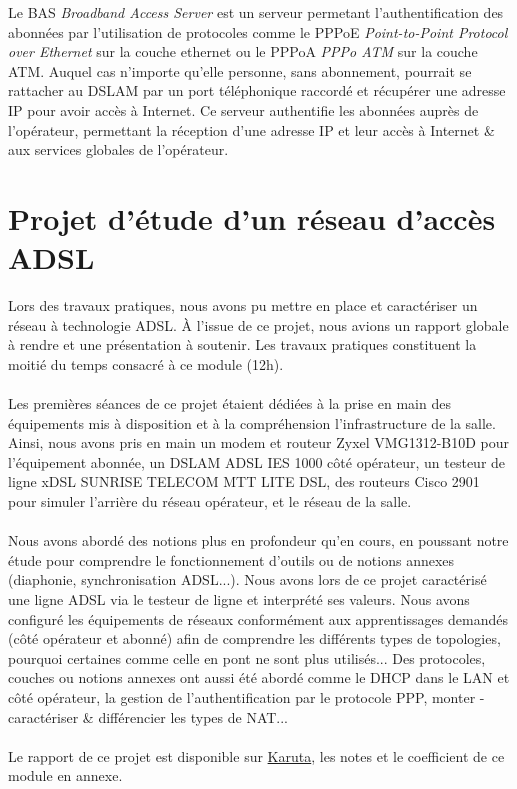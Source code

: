 Le BAS \textit{Broadband Access Server} est un serveur permetant l'authentification des abonnées par l'utilisation de protocoles comme le PPPoE \textit{Point-to-Point Protocol over Ethernet} sur la couche ethernet ou le PPPoA \textit{PPPo ATM} sur la couche ATM. Auquel cas n'importe qu'elle personne, sans abonnement, pourrait se rattacher au DSLAM par un port téléphonique raccordé et récupérer une adresse IP pour avoir accès à Internet. Ce serveur authentifie les abonnées auprès de l'opérateur, permettant la réception d'une adresse IP et leur accès à Internet \& aux services globales de l'opérateur.

\section{Projet d'étude d'un réseau d'accès ADSL}

Lors des travaux pratiques, nous avons pu mettre en place et caractériser un réseau à technologie ADSL. À l'issue de ce projet, nous avions un rapport globale à rendre et une présentation à soutenir. Les travaux pratiques constituent la moitié du temps consacré à ce module (12h).
\\ \\
Les premières séances de ce projet étaient dédiées à la prise en main des équipements mis à disposition et à la compréhension l'infrastructure de la salle. Ainsi, nous avons pris en main un modem et routeur Zyxel VMG1312-B10D pour l'équipement abonnée, un DSLAM ADSL IES 1000 côté opérateur, un testeur de ligne xDSL SUNRISE TELECOM MTT LITE DSL, des routeurs Cisco 2901 pour simuler l'arrière du réseau opérateur, et le réseau de la salle.
\\ \\
Nous avons abordé des notions plus en profondeur qu'en cours, en poussant notre étude pour comprendre le fonctionnement d'outils ou de notions annexes (diaphonie, synchronisation ADSL...). Nous avons lors de ce projet caractérisé une ligne ADSL via le testeur de ligne et interprété ses valeurs. Nous avons configuré les équipements de réseaux conformément aux apprentissages demandés (côté opérateur et abonné) afin de comprendre les différents types de topologies, pourquoi certaines comme celle en pont ne sont plus utilisés... Des protocoles, couches ou notions annexes ont aussi été abordé comme le DHCP dans le LAN et côté opérateur, la gestion de l'authentification par le protocole PPP, monter - caractériser \& différencier les types de NAT...
\\ \\
Le rapport de ce projet est disponible sur \href{https://karuta.univ-pau.fr/karuta-backend/resources/resource/file/1e82435e-9d2d-11ee-a8e6-aae0820000f2?lang=fr&timestamp=1706858357601https://karuta.univ-pau.fr/karuta-backend/resources/resource/file/1e82435e-9d2d-11ee-a8e6-aae0820000f2?lang=fr&timestamp=1706858357601}{Karuta}, les notes et le coefficient de ce module en annexe.

